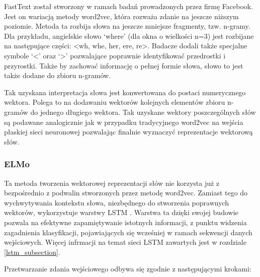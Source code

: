 FastText został stworzony w ramach badań prowadzonych przez firmę Facebook\cite{Bojanowski2016}. Jest on wariacją metody word2vec, która rozważa zdanie na jeszcze niższym poziomie. Metoda ta rozbija słowa na jeszcze mniejsze fragmenty, tzw. n-gramy. Dla przykładu, angielskie słowo ‘where’ (dla okna o wielkości n=3) jest rozbijane na następujące części: <wh, whe, her, ere, re>. Badacze dodali także specjalne symbole ‘<’ oraz ‘>’ pozwalające poprawnie identyfikować przedrostki i przyrostki. Także by zachować informację o pełnej formie słowa, słowo to jest także dodane do zbioru n-gramów.

Tak uzyskana interpretacja słowa jest konwertowana do postaci numerycznego wektora. Polega to na dodawaniu wektorów kolejnych elementów zbioru n-gramów do jednego długiego wektora. Tak uzyskane wektory poszczególnych słów są podawane analogicznie jak w przypadku tradycyjnego word2vec na wejścia płaskiej sieci neuronowej pozwalając finalnie wyznaczyć reprezentacje wektorową słów.


\subsubsection{ELMo}

Ta metoda tworzenia wektorowej reprezentacji słów nie korzysta już z bezpośrednio z podwalin stworzonych przez metodę word2vec. Zamiast tego do wychwytywania kontekstu słowa, niezbędnego do stworzenia poprawnych wektorów, wykorzystuje warstwy LSTM \cite{Gardner2017AllenNLP}. Warstwa ta dzięki swojej budowie pozwala na efektywne zapamiętywanie istotnych informacji, z punktu widzenia zagadnienia klasyfikacji, pojawiających się wcześniej w ramach sekwencji danych wejściowych. Więcej infrmacji na temat sieci LSTM zawartych jest w rozdziale \ref{lstm_subsection}.



\noindent Przetwarzanie zdania wejściowego odbywa się zgodnie z następującymi krokami:

